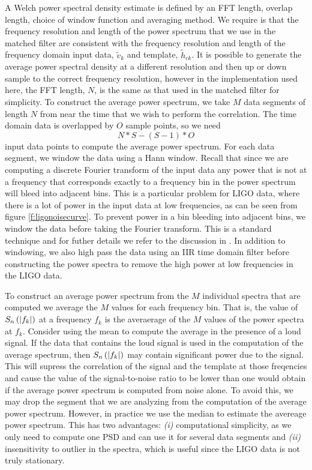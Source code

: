 A Welch power spectral density estimate is defined by an FFT length, overlap
length, choice of window function and averaging method. We require is that the
frequency resolution and length of the power spectrum that we use in the
matched filter are consistent with the frequency resolution and length of the
frequency domain input data, $\tilde{v}_k$ and template, $\tilde{h}_{ck}$. It
is possible to generate the average power spectral density at a different
resolution and then up or down sample to the correct frequency resolution,
however in the implementation used here, the FFT length, $N$, is the same as
that used in the matched filter for simplicity.  To construct the average
power spectrum, we take $M$ data segments of length $N$ from near the time
that we wish to perform the correlation. The time domain data is overlapped
by $O$ sample points, so we need
\begin{equation}
N * S - ( S - 1 ) * O
\end{equation}
input data points to compute the average power spectrum. For each data
segment, we window the data using a Hann window. Recall that since we are
computing a discrete Fourier transform of the input data any power that is not
at a frequency that corresponds exactly to a frequency bin in the power
spectrum will bleed into adjacent bins. This is a particular problem for LIGO
data, where there is a lot of power in the input data at low frequencies, as
can be seen from figure \ref{f:ligonoisecurve}. To prevent power in a
bin bleeding into adjacent bins, we window the data before taking the Fourier
transform. This is a standard technique and for futher details we refer to the
discussion in \cite{numrec}. In addition to windowing, we also high pass the
data using an IIR time domain filter before constructing the power spectra to
remove the high power at low frequencies in the LIGO data.

To construct an average power spectrum from the $M$ individual spectra that
are computed we average the $M$ values for each frequency bin. That is, the
value of $S_n\left(\left|f_{k}\right|\right)$ at a frequency $f_k$ is the averaerage of the $M$ values of
the power spectra at $f_k$. Consider using the mean to compute the average in
the presence of a loud signal. If the data that contains the loud signal is
used in the computation of the average spectrum, then $S_n\left(\left|f_{k}\right|\right)$ may contain
significant power due to the signal. This will supress the correlation of the
signal and the template at those freqencies and cause the value of the
signal-to-noise ratio to be lower than one would obtain if the average power
spectrum is computed from noise alone. To avoid this, we may drop the segment
that we are analyzing from the computation of the average power spectrum. 
However, in practice we use the median to estimate the avereage power
spectrum. This has two advantages: \emph{(i)} computational simplicity, as we
only need to compute one PSD and can use it for several data segments and
\emph{(ii)} insensitivity to outlier in the spectra, which is useful since the
LIGO data is not truly stationary.

